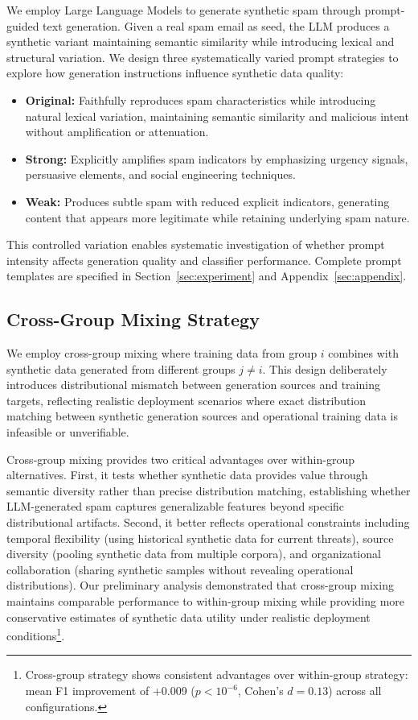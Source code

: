 We employ Large Language Models to generate synthetic spam through prompt-guided text generation. Given a real spam email as seed, the LLM produces a synthetic variant maintaining semantic similarity while introducing lexical and structural variation. We design three systematically varied prompt strategies to explore how generation instructions influence synthetic data quality:
\begin{itemize}
    \item \textbf{Original:} Faithfully reproduces spam characteristics while introducing natural lexical variation, maintaining semantic similarity and malicious intent without amplification or attenuation.

    \item \textbf{Strong:} Explicitly amplifies spam indicators by emphasizing urgency signals, persuasive elements, and social engineering techniques.

    \item \textbf{Weak:} Produces subtle spam with reduced explicit indicators, generating content that appears more legitimate while retaining underlying spam nature.
    
\end{itemize}

This controlled variation enables systematic investigation of whether prompt intensity affects generation quality and classifier performance. Complete prompt templates are specified in Section~\ref{sec:experiment} and Appendix~\ref{sec:appendix}.

\subsection{Cross-Group Mixing Strategy}

We employ cross-group mixing where training data from group $i$ combines with synthetic data generated from different groups $j \neq i$. This design deliberately introduces distributional mismatch between generation sources and training targets, reflecting realistic deployment scenarios where exact distribution matching between synthetic generation sources and operational training data is infeasible or unverifiable.

Cross-group mixing provides two critical advantages over within-group alternatives. First, it tests whether synthetic data provides value through semantic diversity rather than precise distribution matching, establishing whether LLM-generated spam captures generalizable features beyond specific distributional artifacts. Second, it better reflects operational constraints including temporal flexibility (using historical synthetic data for current threats), source diversity (pooling synthetic data from multiple corpora), and organizational collaboration (sharing synthetic samples without revealing operational distributions). Our preliminary analysis demonstrated that cross-group mixing maintains comparable performance to within-group mixing while providing more conservative estimates of synthetic data utility under realistic deployment conditions\footnote{Cross-group strategy shows consistent advantages over within-group strategy: mean F1 improvement of +0.009 ($p < 10^{-6}$, Cohen's $d = 0.13$) across all configurations.}.

